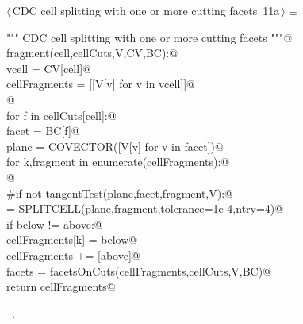 \documentclass[11pt,oneside]{article}	%
\begin{document}
\begin{flushleft} \small \label{scrap10}
\protect{}$\langle\,$CDC cell splitting with one or more cutting facets\nobreak\ {\footnotesize 11a}$\,\rangle\equiv$
\vspace{-1ex}
\begin{list}{}{} \item
\mbox{}\verb@""" CDC cell splitting with one or more cutting facets """@\\
\mbox{}\verb@def fragment(cell,cellCuts,V,CV,BC):@\\
\mbox{}\verb@   vcell = CV[cell]@\\
\mbox{}\verb@   cellFragments = [[V[v] for v in vcell]]@\\
\mbox{}\verb@   @\\
\mbox{}\verb@   for f in cellCuts[cell]:@\\
\mbox{}\verb@      facet = BC[f]@\\
\mbox{}\verb@      plane = COVECTOR([V[v] for v in facet])@\\
\mbox{}\verb@      for k,fragment in enumerate(cellFragments):@\\
\mbox{}\verb@      @\\
\mbox{}\verb@         #if not tangentTest(plane,facet,fragment,V):@\\
\mbox{} = SPLITCELL(plane,fragment,tolerance=1e-4,ntry=4)@\\
\mbox{}\verb@         if below != above:@\\
\mbox{}\verb@            cellFragments[k] = below@\\
\mbox{}\verb@            cellFragments += [above]@\\
\mbox{}\verb@      facets = facetsOnCuts(cellFragments,cellCuts,V,BC)@\\
\mbox{}\verb@   return cellFragments@\\
\mbox{}\verb@@{\NWsep}
\end{list}
\vspace{-1ex}
\footnotesize\addtolength{\baselineskip}{-1ex}
\begin{list}{}{\setlength{\itemsep}{-\parsep}\setlength{\itemindent}{-\leftmargin}}
\item \NWtxtMacroRefIn\ .
\end{list}
\end{flushleft}
\end{document}
